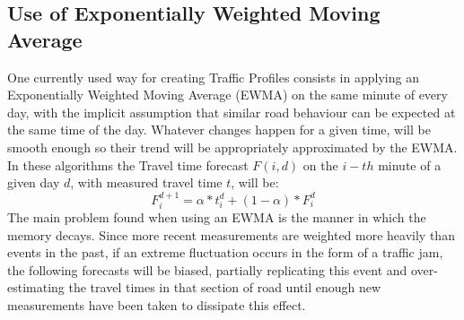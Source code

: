 \documentclass[conference]{IEEEtran}
\begin{document}
\subsection{Use of Exponentially Weighted Moving Average} \label{ewma}
One currently used way for creating Traffic Profiles consists in applying an Exponentially Weighted Moving Average (EWMA) on the same minute of every day, with the implicit assumption that similar road behaviour can be expected at the same time of the day. 
Whatever changes happen for a given time, will be smooth enough so their trend will be appropriately approximated by the EWMA.
In these algorithms the Travel time forecast $F(i,d)$ on the $i-th$ minute of a given day $d$, with measured travel time $t$, will be:
\begin{equation}
F^{d+1}_i = \alpha * t^{d}_{i} + (1-\alpha)*F^{d}_{i}
\end{equation}
The main problem found when using an EWMA is the manner in which the memory decays. 
Since more recent measurements are weighted more heavily than events in the past, if an extreme fluctuation occurs in the form of a traffic jam, the following forecasts will be biased, partially replicating this event and over-estimating the travel times in that section of road until enough new measurements have been taken to dissipate this effect.
\end{document}
